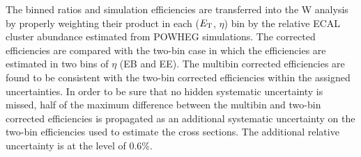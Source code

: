 The binned ratios and simulation efficiencies are transferred into the W analysis by properly weighting 
their product in each ($E\,\,_{\!\!\!\mathrm{T}}$, $\eta$) bin by the relative ECAL cluster abundance
estimated from {\sc POWHEG} simulations. The corrected efficiencies are compared with the 
two-bin case in which the efficiencies are estimated in two bins of $\eta$ (EB and EE). 
The multibin corrected efficiencies are found to be consistent with the  two-bin 
corrected efficiencies within the assigned uncertainties. 
In order to be sure that no hidden systematic uncertainty is missed,  half of the 
maximum difference between the multibin and two-bin corrected efficiencies 
is propagated as an additional systematic uncertainty on the two-bin efficiencies used to estimate the cross 
sections. The additional relative uncertainty is at the level of 0.6$\%$.  


